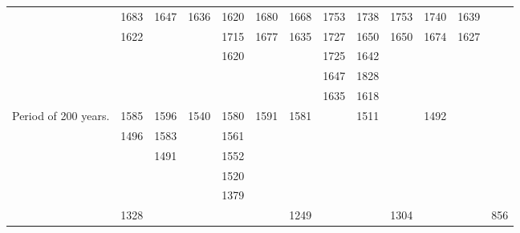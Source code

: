 \documentclass[a4paper, 12pt, oneside]{article}
\begin{document}
\begin{landscape}
\begin{table}[!ht]
\begin{tabular}{|l|l|l|l|l|l|l|l|l|l|l|l|l|}
        ~ & 1683 & 1647 & 1636 & 1620 & 1680 & 1668 & 1753 & 1738 & 1753 & 1740 & 1639 & ~ \\
        ~ & 1622 & ~ & ~ & 1715 & 1677 & 1635 & 1727 & 1650 & 1650 & 1674 & 1627 & ~ \\
        ~ & ~ & ~ & ~ & 1620 & ~ & ~ & 1725 & 1642 & ~ & ~ & ~ & ~ \\
        ~ & ~ & ~ & ~ & ~ & ~ & ~ & 1647 & 1828 & ~ & ~ & ~ & ~ \\
        ~ & ~ & ~ & ~ & ~ & ~ & ~ & 1635 & 1618 & ~ & ~ & ~ & ~ \\ \hline
        Period of 200 years. & 1585 & 1596 & 1540 & 1580 & 1591 & 1581 & ~ & 1511 & ~ & 1492 & ~ & ~ \\
        ~ & 1496 & 1583 & ~ & 1561 & ~ & ~ & ~ & ~ & ~ & ~ & ~ & ~ \\
        ~ & ~ & 1491 & ~ & 1552 & ~ & ~ & ~ & ~ & ~ & ~ & ~ & ~ \\
        ~ & ~ & ~ & ~ & 1520 & ~ & ~ & ~ & ~ & ~ & ~ & ~ & ~ \\
        ~ & ~ & ~ & ~ & 1379 & ~ & ~ & ~ & ~ & ~ & ~ & ~ & ~ \\ \hline
        ~ & 1328 & ~ & ~ & ~ & ~ & 1249 & ~ & ~ & 1304 & ~ & ~ & 856 \\ \hline
    \end{tabular}
\end{table}
\end{landscape}
\clearpage
\end{document}
